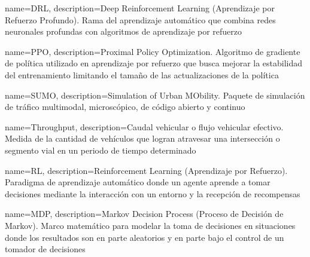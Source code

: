 {
        name=DRL,
        description={Deep Reinforcement Learning (Aprendizaje por Refuerzo Profundo). Rama del aprendizaje automático que combina redes neuronales profundas con algoritmos de aprendizaje por refuerzo}
}

{
        name=PPO,
        description={Proximal Policy Optimization. Algoritmo de gradiente de política utilizado en aprendizaje por refuerzo que busca mejorar la estabilidad del entrenamiento limitando el tamaño de las actualizaciones de la política}
}

{
        name=SUMO,
        description={Simulation of Urban MObility. Paquete de simulación de tráfico multimodal, microscópico, de código abierto y continuo}
}

{
        name=Throughput,
        description={Caudal vehicular o flujo vehicular efectivo. Medida de la cantidad de vehículos que logran atravesar una intersección o segmento vial en un periodo de tiempo determinado}
}

{
        name=RL,
        description={Reinforcement Learning (Aprendizaje por Refuerzo). Paradigma de aprendizaje automático donde un agente aprende a tomar decisiones mediante la interacción con un entorno y la recepción de recompensas}
}

{
        name=MDP,
        description={Markov Decision Process (Proceso de Decisión de Markov). Marco matemático para modelar la toma de decisiones en situaciones donde los resultados son en parte aleatorios y en parte bajo el control de un tomador de decisiones}
}
